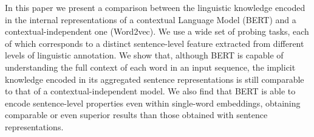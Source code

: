 In this paper we present a comparison between the linguistic knowledge encoded in the internal representations of a contextual Language Model (BERT) and a contextual-independent one (Word2vec). We use a wide set of probing tasks, each of which corresponds to a distinct sentence-level feature extracted from different levels of linguistic annotation. We show that, although BERT is capable of understanding the full context of each word in an input sequence, the implicit knowledge encoded in its aggregated sentence representations is still comparable to that of a contextual-independent model. We also find that BERT is able to encode sentence-level properties even within single-word embeddings, obtaining comparable or even superior results than those obtained with sentence representations.

